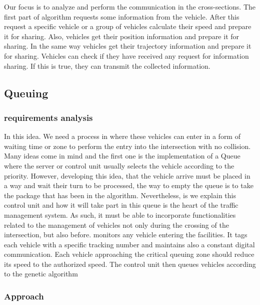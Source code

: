 \documentclass[conference]{IEEEtran}
\begin{document}
Our focus is to analyze and perform the communication in the cross-sections. The first part of algorithm requests some information from the vehicle. After this request a specific vehicle or a group of vehicles calculate their speed and prepare it for sharing. Also, vehicles get their position information and prepare it for sharing. In the same way vehicles get their trajectory information and prepare it for sharing. Vehicles can check if they have received any request for information sharing. If this is true, they can transmit the collected information.



\subsection{Queuing}
\subsubsection{requirements analysis }
In this idea. We need a process in where these vehicles can enter in a form of waiting time or zone to perform the entry into the intersection with no collision. Many ideas come in mind and the first one is the implementation of a Queue where the server or control unit usually selects the vehicle according to the priority. However, developing this idea, that the vehicle arrive must be placed in a way and wait their turn to be processed, the way to empty the queue is to take the package that has been in the algorithm. 
\vspace{3mm}
Nevertheless, is we explain this control unit and how it will take part in this queue is the heart of the traffic management system. As such, it must be able to incorporate functionalities related to the management of vehicles not only during the crossing of the intersection, but also before. monitors any vehicle entering the facilities. It tags each vehicle with a specific tracking number and maintains also a constant digital communication. Each vehicle approaching the critical queuing zone should reduce its speed to the authorized speed. The control unit then queues vehicles according to the genetic algorithm







\subsubsection{Approach }
\end{document}
